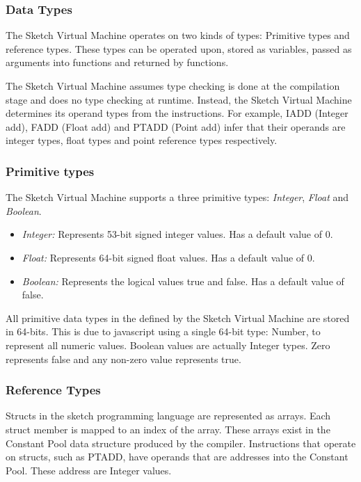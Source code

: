 \documentclass{l3proj}
\begin{document}
\subsubsection{Data Types}
The Sketch Virtual Machine operates on two kinds of types: Primitive types and reference types. These types can be operated upon, stored as variables, passed as arguments into functions and returned by functions. 

The Sketch Virtual Machine assumes type checking is done at the compilation stage and does no type checking at runtime. Instead, the Sketch Virtual Machine determines its operand types from the instructions. For example, IADD (Integer add), FADD (Float add) and PTADD (Point add) infer that their operands are integer types, float types and point reference types respectively. 

\subsubsection{Primitive types}
The Sketch Virtual Machine supports a three primitive types: \textit{Integer}, \textit{Float} and \textit{Boolean}.
\begin{itemize}
	\item \textit{Integer:} Represents 53-bit signed integer values. Has a default value of 0. 
	\item \textit{Float:} Represents 64-bit signed float values. Has a default value of 0.
	\item \textit{Boolean:} Represents the logical values true and false. Has a default value of false.
\end{itemize}
All primitive data types in the defined by the Sketch Virtual Machine are stored in 64-bits. This is due to javascript using a single 64-bit type: Number, to represent all numeric values. Boolean values are actually Integer types. Zero represents false and any non-zero value represents true.

\subsubsection{Reference Types}
Structs in the sketch programming language are represented as arrays. Each struct member is mapped to an index of the array. These arrays exist in the Constant Pool data structure produced by the compiler. Instructions that operate on structs, such as PTADD, have operands that are addresses into the Constant Pool. These address are Integer values.
\end{document}
